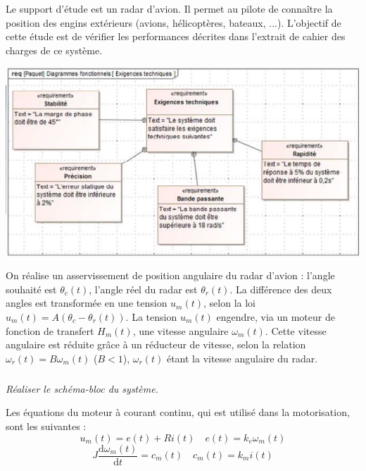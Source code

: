 \documentclass[10pt,fleqn]{article} %
\begin{document}

\vspace{8cm}
\pagestyle{fancy}
\thispagestyle{plain}

\def\columnseprulecolor{\color{ocre}}
\setlength{\columnseprule}{0.4pt} 

\def\pathfig{images}

\begin{multicols}{2}
Le support d'étude est un radar d'avion. Il permet au pilote de connaître la position des engins extérieurs (avions, hélicoptères, bateaux, ...). L'objectif de cette étude est de vérifier les performances décrites dans l’extrait de cahier des charges de ce système. 

\begin{center}
\includegraphics[width=\linewidth]{images/fig_02}
\end{center}

On réalise un asservissement de position angulaire du radar d’avion : l'angle souhaité est $\theta_c (t)$, l'angle réel du radar est $\theta_r (t)$. La différence des deux angles est transformée en une tension $u_m (t)$, selon la loi $u_m (t)= A(\theta_c - \theta_r (t))$. La tension $u_m (t)$ engendre, via un moteur de fonction de transfert $H_m (t)$, une vitesse angulaire $\omega_m (t)$. Cette vitesse angulaire est réduite grâce à un réducteur de vitesse, selon la relation $\omega_r (t) = B \omega_m (t)$ ($B<1$), $\omega_r (t)$ étant la vitesse angulaire du radar. 

\subparagraph{}\textit{Réaliser le schéma-bloc du système. }

Les équations du moteur à courant continu, qui est utilisé dans la motorisation, sont les suivantes : 
$$
u_m(t)=e(t)+Ri(t) 
\quad e(t)=k_e\omega_m(t) 
$$
$$J \dfrac{\text{d}\omega_m(t)}{\text{d}t} = c_m(t)
\quad c_m(t) = k_m i(t)
$$



\end{multicols}
\end{document}
